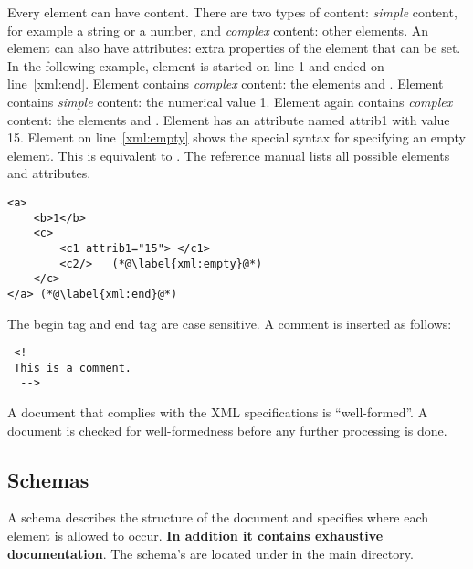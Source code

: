 Every element can have content. There are two types of content:
\emph{simple} content, for example a string or a number, and
\emph{complex} content: other elements. An element can also have
attributes: extra properties of the element that can be set.
 In the following example, element  is started
on line 1 and ended on line~\ref{xml:end}. Element 
contains \emph{complex} content: the elements  and
. Element  contains \emph{simple} content:
the numerical value 1. Element  again contains
\emph{complex} content: the elements  and
. Element  has an attribute named attrib1
with value 15. Element  on line~\ref{xml:empty} shows
the special syntax for specifying an empty element. This is
equivalent to . The reference manual lists all
possible elements and attributes.

\begin{lstlisting}
<a>
    <b>1</b>
    <c>
        <c1 attrib1="15"> </c1>
        <c2/>   (*@\label{xml:empty}@*)
    </c>
</a> (*@\label{xml:end}@*)
\end{lstlisting}

The begin tag and end tag are case sensitive. A comment is
inserted as follows:
\begin{lstlisting}
 <!--
 This is a comment.
  -->
\end{lstlisting}





A document that complies with the XML specifications is
``well-formed''. A document is checked for well-formedness before
any further processing is done.

\subsection{Schemas}
\label{sec:Schema's}


A schema describes the structure of the document and specifies
where each element is allowed to occur. \textbf{In addition it contains exhaustive 
documentation}. The \apex schema's are located under
 in the main \apex directory.

